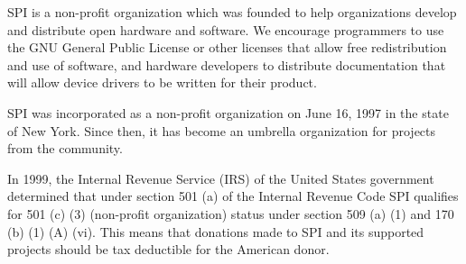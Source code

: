 \documentclass[letterpaper]{report}
\begin{document}
SPI is a non-profit organization which was founded to help organizations
develop and distribute open hardware and software. We encourage programmers
to use the GNU General Public License or other licenses that allow free
redistribution and use of software, and hardware developers to distribute
documentation that will allow device drivers to be written for their product.

SPI was incorporated as a non-profit organization on June 16, 1997 in the state
of New York. Since then, it has become an umbrella organization for projects
from the community.

In 1999, the Internal Revenue Service (IRS) of the United States government
determined that under section 501 (a) of the Internal Revenue Code SPI
qualifies for 501 (c) (3) (non-profit organization) status under section 509
(a) (1) and 170 (b) (1) (A) (vi). This means that donations made to SPI and its
supported projects should be tax deductible for the American donor.
\end{document}
